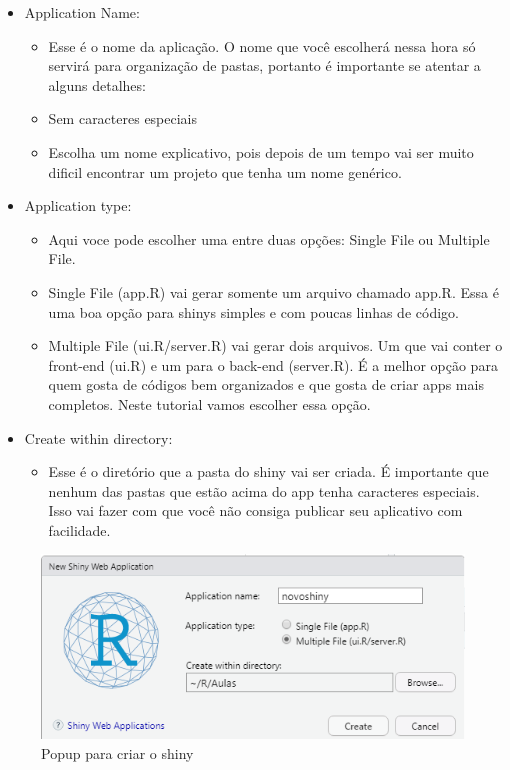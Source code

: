 \documentclass[
]{book}
\providecommand{\tightlist}{%
  \setlength{\itemsep}{0pt}\setlength{\parskip}{0pt}}
\begin{document}
\begin{itemize}
\tightlist
\item
  Application Name:

  \begin{itemize}
  \tightlist
  \item
    Esse é o nome da aplicação. O nome que você escolherá nessa hora só servirá para organização de pastas, portanto é importante se atentar a alguns detalhes:
  \item
    Sem caracteres especiais
  \item
    Escolha um nome explicativo, pois depois de um tempo vai ser muito dificil encontrar um projeto que tenha um nome genérico.
  \end{itemize}
\item
  Application type:

  \begin{itemize}
  \tightlist
  \item
    Aqui voce pode escolher uma entre duas opções: Single File ou Multiple File.
  \item
    Single File (app.R) vai gerar somente um arquivo chamado app.R. Essa é uma boa opção para shinys simples e com poucas linhas de código.
  \item
    Multiple File (ui.R/server.R) vai gerar dois arquivos. Um que vai conter o front-end (ui.R) e um para o back-end (server.R). É a melhor opção para quem gosta de códigos bem organizados e que gosta de criar apps mais completos. Neste tutorial vamos escolher essa opção.
  \end{itemize}
\item
  Create within directory:

  \begin{itemize}
  \tightlist
  \item
    Esse é o diretório que a pasta do shiny vai ser criada. É importante que nenhum das pastas que estão acima do app tenha caracteres especiais. Isso vai fazer com que você não consiga publicar seu aplicativo com facilidade.
  \end{itemize}
\end{itemize}

\begin{figure}
\centering
\includegraphics{./imagens/cap10imagem2.png}
\caption{Popup para criar o shiny}
\end{figure}
\end{document}
